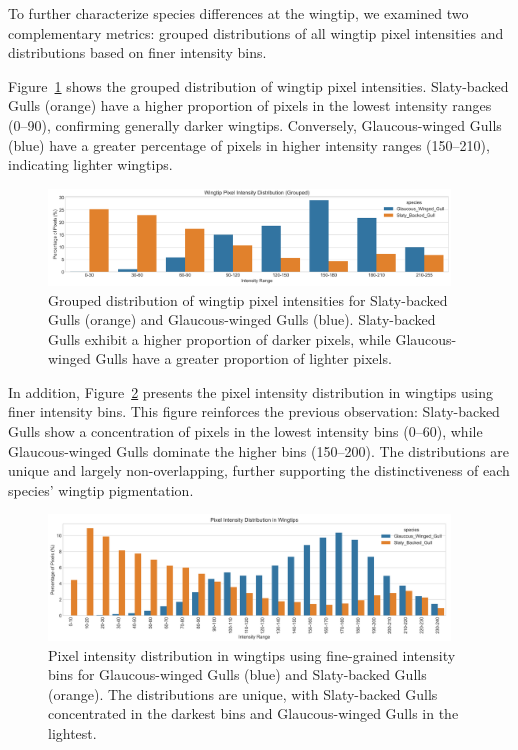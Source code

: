 \documentclass[a4paper,12pt]{report}
\begin{document}
To further characterize species differences at the wingtip, we examined two complementary metrics: grouped distributions of all wingtip pixel intensities and distributions based on finer intensity bins.

Figure~\ref{fig:wingtip_intensity_distribution_grouped} shows the grouped distribution of wingtip pixel intensities. Slaty-backed Gulls (orange) have a higher proportion of pixels in the lowest intensity ranges (0--90), confirming generally darker wingtips. Conversely, Glaucous-winged Gulls (blue) have a greater percentage of pixels in higher intensity ranges (150--210), indicating lighter wingtips.

\begin{figure}[h]
    \centering
    \includegraphics[width=0.95\textwidth]{images/REPORT_IMAGES_INTENSITY/I2/intensitydistribution.png}
    \caption{Grouped distribution of wingtip pixel intensities for Slaty-backed Gulls (orange) and Glaucous-winged Gulls (blue). Slaty-backed Gulls exhibit a higher proportion of darker pixels, while Glaucous-winged Gulls have a greater proportion of lighter pixels.}
    \label{fig:wingtip_intensity_distribution_grouped}
\end{figure}

In addition, Figure~\ref{fig:wingtip_intensity_distribution_fine} presents the pixel intensity distribution in wingtips using finer intensity bins. This figure reinforces the previous observation: Slaty-backed Gulls show a concentration of pixels in the lowest intensity bins (0--60), while Glaucous-winged Gulls dominate the higher bins (150--200). The distributions are unique and largely non-overlapping, further supporting the distinctiveness of each species' wingtip pigmentation.

\begin{figure}[h]
    \centering
    \includegraphics[width=0.95\textwidth]{images/REPORT_IMAGES_INTENSITY/I2/TIPdistribution.png}
    \caption{Pixel intensity distribution in wingtips using fine-grained intensity bins for Glaucous-winged Gulls (blue) and Slaty-backed Gulls (orange). The distributions are unique, with Slaty-backed Gulls concentrated in the darkest bins and Glaucous-winged Gulls in the lightest.}
    \label{fig:wingtip_intensity_distribution_fine}
\end{figure}
\end{document}

